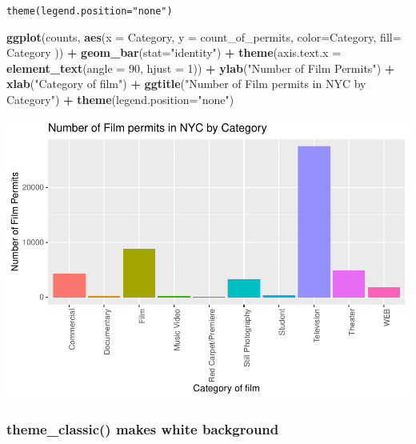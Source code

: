 \documentclass[]{book}
\newenvironment{Shaded}{\begin{snugshade}}{\end{snugshade}}
\newcommand{\KeywordTok}[1]{\textcolor[rgb]{0.13,0.29,0.53}{\textbf{#1}}}
\newcommand{\DataTypeTok}[1]{\textcolor[rgb]{0.13,0.29,0.53}{#1}}
\newcommand{\DecValTok}[1]{\textcolor[rgb]{0.00,0.00,0.81}{#1}}
\newcommand{\StringTok}[1]{\textcolor[rgb]{0.31,0.60,0.02}{#1}}
\newcommand{\OperatorTok}[1]{\textcolor[rgb]{0.81,0.36,0.00}{\textbf{#1}}}
\newcommand{\NormalTok}[1]{#1}
\begin{document}
\texttt{theme(legend.position="none")}

\begin{Shaded}
\begin{Highlighting}[]
\KeywordTok{ggplot}\NormalTok{(counts, }\KeywordTok{aes}\NormalTok{(}\DataTypeTok{x =}\NormalTok{ Category, }\DataTypeTok{y =}\NormalTok{ count_of_permits, }
                   \DataTypeTok{color=}\NormalTok{Category, }
                   \DataTypeTok{fill=}\NormalTok{ Category )) }\OperatorTok{+}
\StringTok{  }\KeywordTok{geom_bar}\NormalTok{(}\DataTypeTok{stat=}\StringTok{"identity"}\NormalTok{) }\OperatorTok{+}\StringTok{ }
\StringTok{  }\KeywordTok{theme}\NormalTok{(}\DataTypeTok{axis.text.x =} \KeywordTok{element_text}\NormalTok{(}\DataTypeTok{angle =} \DecValTok{90}\NormalTok{, }\DataTypeTok{hjust =} \DecValTok{1}\NormalTok{)) }\OperatorTok{+}
\StringTok{  }\KeywordTok{ylab}\NormalTok{(}\StringTok{"Number of Film Permits"}\NormalTok{) }\OperatorTok{+}\StringTok{ }
\StringTok{  }\KeywordTok{xlab}\NormalTok{(}\StringTok{"Category of film"}\NormalTok{) }\OperatorTok{+}
\StringTok{  }\KeywordTok{ggtitle}\NormalTok{(}\StringTok{"Number of Film permits in NYC by Category"}\NormalTok{) }\OperatorTok{+}
\StringTok{  }\KeywordTok{theme}\NormalTok{(}\DataTypeTok{legend.position=}\StringTok{"none"}\NormalTok{)}
\end{Highlighting}
\end{Shaded}

\includegraphics{Statistics_Lab_files/figure-latex/1categoryH-1.pdf}

\subsubsection{theme\_classic() makes white
background}\label{theme_classic-makes-white-background}
\end{document}
